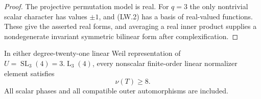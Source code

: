 \begin{proof}
The projective permutation model is real. For $q=3$ the only
nontrivial scalar character has values $\pm1$, and (LW.2) has
a basis of real-valued functions. These give the asserted real
forms, and averaging a real inner product supplies a nondegenerate
invariant symmetric bilinear form after complexification.
\end{proof}

\begin{lemma}
\label{D-BI-23b}
In either degree-twenty-one linear Weil representation of
$U=\operatorname{SL}_3(4)=3.\operatorname{L}_3(4)$, every
nonscalar finite-order linear normalizer element satisfies
\[
                         \nu(T)\ge8.                         \tag{LW.5}
\]
All scalar phases and all compatible outer automorphisms are included.
\end{lemma}

